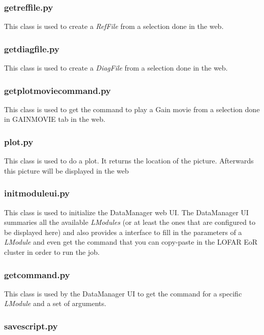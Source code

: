 \documentclass[a4paper,11pt]{article}
\begin{document}
\subsubsection*{getreffile.py}

This class is used to create a \textit{RefFile} from a selection done in the web.

\subsubsection*{getdiagfile.py}

This class is used to create a \textit{DiagFile} from a selection done in the web.

\subsubsection*{getplotmoviecommand.py}

This class is used to get the command to play a Gain movie from a selection done in GAINMOVIE tab in the web.

\subsubsection*{plot.py}

This class is used to do a plot. It returns the location of the picture. Afterwards this picture will be displayed in the web

\subsubsection*{initmoduleui.py}

This class is used to initialize the DataManager web UI. The DataManager UI summaries all the available \textit{LModules} (or at least the ones that are configured to be displayed here) and also provides a interface to fill in the parameters of a \textit{LModule} and even get the command that you can copy-paste in the LOFAR EoR cluster in order to run the job.

\subsubsection*{getcommand.py}

This class is used by the DataManager UI to get the command for a specific \textit{LModule} and a set of arguments.

\subsubsection*{savescript.py}
\end{document}
